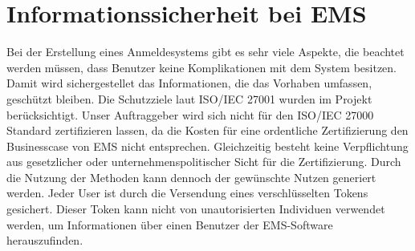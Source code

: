 \section{Informationssicherheit bei EMS}
Bei der Erstellung eines Anmeldesystems gibt es sehr viele Aspekte, die beachtet werden müssen, dass Benutzer keine Komplikationen mit dem System besitzen. Damit wird sichergestellet das Informationen, die das Vorhaben umfassen, geschützt bleiben. Die Schutzziele laut ISO/IEC 27001 wurden im Projekt berücksichtigt. Unser Auftraggeber wird sich nicht für den ISO/IEC 27000 Standard zertifizieren lassen, da die Kosten für eine ordentliche Zertifizierung den Businesscase von EMS nicht entsprechen. Gleichzeitig besteht keine Verpflichtung aus gesetzlicher oder unternehmenspolitischer Sicht für die Zertifizierung. Durch die Nutzung der Methoden kann dennoch der gewünschte Nutzen generiert werden.
Jeder User ist durch die Versendung eines verschlüsselten Tokens gesichert. Dieser Token kann nicht von unautorisierten Individuen verwendet werden, um Informationen über einen Benutzer der EMS-Software herauszufinden. 

